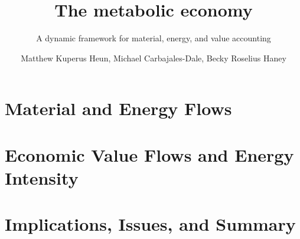 \documentclass[graybox,envcountchap,sectrefs]{svmono}
\begin{document}
\author{Matthew Kuperus Heun, Michael Carbajales-Dale, Becky Roselius Haney}
\title{The metabolic economy}
\subtitle{A dynamic framework for material, energy, and value accounting}
\maketitle{}

\frontmatter%

%
%
%
%

\tableofcontents{}
\listoffigures{}
\listoftables{}
\printnomenclature{}   %

%


\mainmatter%



\part{Material and Energy Flows}







\part{Economic Value Flows and Energy Intensity}

 

 

\part{Implications, Issues, and Summary}







\appendix












\backmatter%
%
%
\printindex{}

\end{document}
